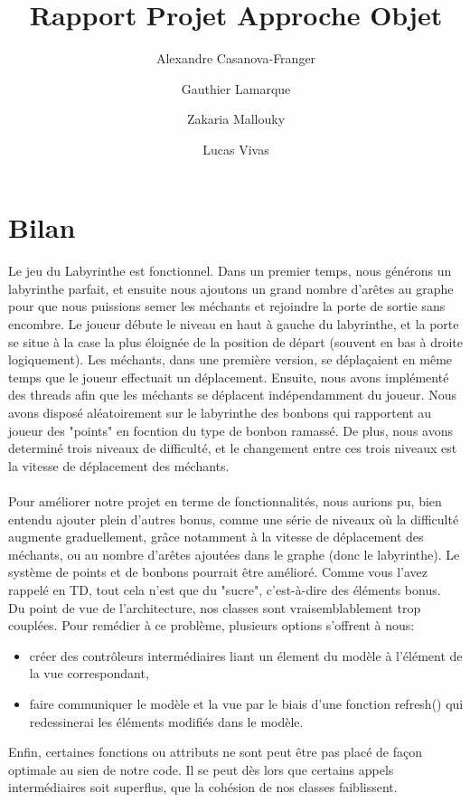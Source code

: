 \documentclass{article}
\title{Rapport Projet Approche Objet}
\author{Alexandre Casanova-Franger\\
        \and
        Gauthier Lamarque\\
        \and
        Zakaria Mallouky\\
        \and
        Lucas Vivas\\
        }
\begin{document}
  \maketitle
  \section{Bilan}
  \paragraph{}
  Le jeu du Labyrinthe est fonctionnel. Dans un premier temps, nous générons un
  labyrinthe parfait, et ensuite nous ajoutons un grand nombre d'arêtes au
  graphe pour que nous puissions semer les méchants et rejoindre la porte de
  sortie sans encombre. Le joueur débute le niveau en haut à gauche du
  labyrinthe, et la porte se situe à la case la plus éloignée de la position de
  départ (souvent en bas à droite logiquement). Les méchants, dans une première
  version, se déplaçaient en même temps que le joueur effectuait un déplacement.
  Ensuite, nous avons implémenté des threads afin que les méchants se déplacent
  indépendamment du joueur. Nous avons disposé aléatoirement sur le labyrinthe
  des bonbons qui rapportent au joueur des "points" en focntion du type de
  bonbon ramassé. De plus, nous avons determiné trois niveaux de difficulté, et le changement
  entre ces trois niveaux est la vitesse de déplacement des méchants.

  \paragraph{}
  Pour améliorer notre projet en terme de fonctionnalités, nous aurions pu, bien
  entendu ajouter plein d'autres bonus, comme une série de niveaux où la
  difficulté augmente graduellement, grâce notamment à la vitesse de déplacement
  des méchants, ou au nombre d'arêtes ajoutées dans le graphe (donc le
  labyrinthe). Le système de points et de bonbons pourrait être amélioré. Comme
  vous l'avez rappelé en TD, tout cela n'est que du "sucre", c'est-à-dire des
  éléments bonus.\\
  Du point de vue de l'architecture, nos classes sont vraisemblablement trop
  couplées. Pour remédier à ce problème, plusieurs options s'offrent à nous:
  \begin{itemize}
    \item créer des contrôleurs intermédiaires liant un élement du modèle à
    l'élément de la vue correspondant,
    \item faire communiquer le modèle et la vue par le biais d'une fonction
    refresh() qui redessinerai les éléments modifiés dans le modèle.
  \end{itemize}
  Enfin, certaines fonctions ou attributs ne sont peut être pas placé de façon
  optimale au sien de notre code. Il se peut dès lors que certains appels
  intermédiaires soit superflus, que la cohésion de nos classes faiblissent.
\end{document}
